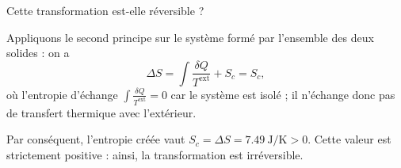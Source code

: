 



\begin{enonce}
Cette transformation est-elle réversible ?\minusMedskip

\end{enonce}


\begin{corrige}
Appliquons le second principe sur le système formé par l'ensemble des deux solides : on a
\[
\Delta S=\int \frac{\delta Q}{T^\text{ext}}+S_c=S_c,
\]
où l'entropie d'échange $\int \frac{\delta Q}{T^\text{ext}}=0$ car le système est isolé ; il n'échange donc pas de transfert thermique avec l'extérieur.

Par conséquent, l'entropie créée vaut $S_c=\Delta S=\SI{7,49}{\joule\per\kelvin}>0$.
Cette valeur est strictement positive : ainsi, la transformation est irréversible.
\end{corrige}


\finEntrainement












\hauteurLargeurCadreReponse		{7mm}{4.5cm}
\typeEntrainement				{} %
\initialisationEntrainement


